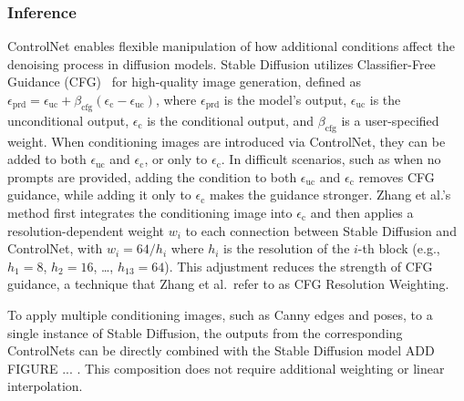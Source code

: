\subsubsection{Inference}
ControlNet enables flexible manipulation of how additional conditions affect the denoising process in diffusion models. Stable Diffusion utilizes Classifier-Free Guidance (CFG)~\cite{ho2022classifierfreediffusionguidance} for high-quality image generation, defined as \(\epsilon_{\text{prd}} = \epsilon_{\text{uc}} + \beta_{\text{cfg}} (\epsilon_{\text{c}} - \epsilon_{\text{uc}})\), where \(\epsilon_{\text{prd}}\) is the model's output, \(\epsilon_{\text{uc}}\) is the unconditional output, \(\epsilon_{\text{c}}\) is the conditional output, and \(\beta_{\text{cfg}}\) is a user-specified weight. When conditioning images are introduced via ControlNet, they can be added to both \(\epsilon_{\text{uc}}\) and \(\epsilon_{\text{c}}\), or only to \(\epsilon_{\text{c}}\). In difficult scenarios, such as when no prompts are provided, adding the condition to both \(\epsilon_{\text{uc}}\) and \(\epsilon_{\text{c}}\) removes CFG guidance, while adding it only to \(\epsilon_{\text{c}}\) makes the guidance stronger. Zhang et al.'s~\cite{zhang2023addingconditionalcontroltexttoimage} method first integrates the conditioning image into \(\epsilon_{\text{c}}\) and then applies a resolution-dependent weight \(w_i\) to each connection between Stable Diffusion and ControlNet, with \(w_i = 64/h_i\) where \(h_i\) is the resolution of the \(i\)-th block (e.g., \(h_1 = 8\), \(h_2 = 16\), \ldots, \(h_{13} = 64\)). This adjustment reduces the strength of CFG guidance, a technique that Zhang et al.\ refer to as CFG Resolution Weighting.

To apply multiple conditioning images, such as Canny edges and poses, to a single instance of Stable Diffusion, the outputs from the corresponding ControlNets can be directly combined with the Stable Diffusion model ADD FIGURE ... . This composition does not require additional weighting or linear interpolation.
